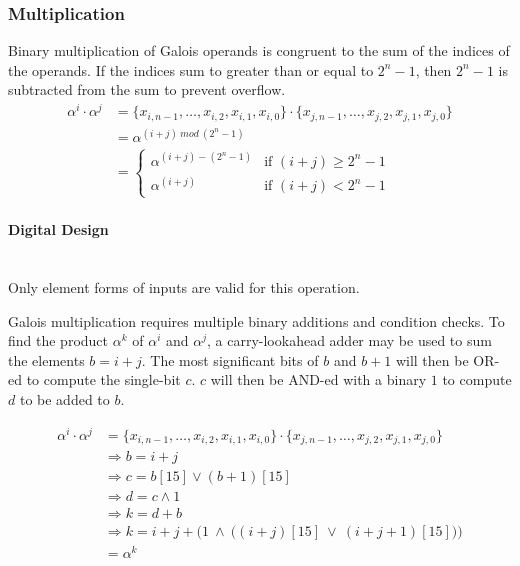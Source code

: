 \subsubsection{Multiplication} Binary multiplication of Galois operands is
congruent to the sum of the indices of the operands. If the indices sum to
greater than or equal to $2^{n}-1$, then $2^{n}-1$ is subtracted from the sum
to prevent overflow.
\begin{align*}
    \alpha^{i} \cdot \alpha^{j} & = \{ x_{i, n-1}, \ldots, x_{i, 2}, x_{i, 1},
    x_{i, 0} \} \cdot \{x_{j, n-1}, \ldots, x_{j, 2}, x_{j, 1}, x_{j, 0}\} \\
    & = \alpha^{(i + j) \ mod \ (2^{n}-1)} \\
    & = \begin{cases}
            \alpha^{(i + j) - (2^{n}-1)} & \text{if $(i + j) \geq 2^{n}-1$} \\
            \alpha^{(i + j)} & \text{if $(i + j) < 2^{n}-1$}
        \end{cases}
\end{align*}

    \paragraph{{\small Digital Design}} \leavevmode \\ Only element forms of
    inputs are valid for this operation.

    Galois multiplication requires multiple binary additions and condition
    checks. To find the product $\alpha^{k}$ of $\alpha^{i}$ and $\alpha^{j}$,
    a carry-lookahead adder may be used to sum the elements $b=i+j$. The most
    significant bits of $b$ and $b + 1$ will then be OR-ed to compute the
    single-bit $c$. $c$ will then be AND-ed with a binary $1$ to compute $d$ to
    be added to $b$.

\begin{align*}
    \alpha^{i} \cdot \alpha^{j} & = \{ x_{i, n-1}, \ldots, x_{i, 2}, x_{i, 1},
    x_{i, 0} \} \cdot \{x_{j, n-1}, \ldots, x_{j, 2}, x_{j, 1}, x_{j, 0}\} \\
    & \Longrightarrow b = i + j \\
    & \Longrightarrow c = b[15] \vee (b+1)[15] \\
    & \Longrightarrow d = c \wedge 1 \\
    & \Longrightarrow k = d + b \\
    & \Longrightarrow k = i + j + \Big(1 \ \wedge \ \big((i+j)[15] \ \vee \
    (i+j+1)[15]\big)\Big) \\
    & = \alpha^{k} \\
\end{align*}
